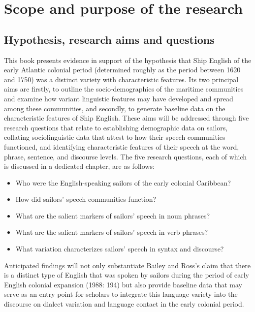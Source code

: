 \section{{Scope} {and} {purpose} {of} {the} {research}  }%



\subsection{{Hypothesis,} {research} {aims} {and} {questions}}%



This book presents evidence in support of the hypothesis that Ship English of the early Atlantic colonial period (determined roughly as the period between 1620 and 1750) was a distinct variety with characteristic features. Its two principal aims are firstly, to outline the socio-demographics of the maritime communities and examine how variant linguistic features may have developed and spread among these communities, and secondly, to generate baseline data on the characteristic features of Ship English. These aims will be addressed through five research questions that relate to establishing demographic data on sailors, collating sociolinguistic data that attest to how their speech communities functioned, and identifying characteristic features of their speech at the word, phrase, sentence, and discourse levels. The five research questions, each of which is discussed in a dedicated chapter, are as follows:


\begin{itemize}
\item Who were the English-speaking sailors of the early colonial Caribbean?
\item How did sailors’ speech communities function?
\item What are the salient markers of sailors’ speech in noun phrases?
\item What are the salient markers of sailors’ speech in verb phrases?
\item What variation characterizes sailors’ speech in syntax and discourse?
\end{itemize}

Anticipated findings will not only substantiate Bailey and Ross’s claim that there is a distinct type of English that was spoken by sailors during the period of early English colonial expansion (1988: 194) but also provide baseline data that may serve as an entry point for scholars to integrate this language variety into the discourse on dialect variation and language contact in the early colonial period. 


